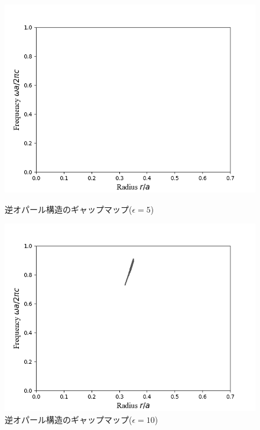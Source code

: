\documentclass[platex,dvipdfmx]{jsreport}
\numberwithin{equation}{section}
\begin{document}
\begin{figure}[h]
  \begin{minipage}[h]{0.5\linewidth}
    \centering
    \includegraphics[keepaspectratio, scale=0.45]{results/gap_map/inv_e-5.png}
    \caption{逆オパール構造のギャップマップ($\epsilon = 5$)}
    \label{fig:gapmap_inv_opal_e-5}
  \end{minipage}
  \begin{minipage}[h]{0.5\linewidth}
    \centering
    \includegraphics[keepaspectratio, scale=0.45]{results/gap_map/inv_e-10.png}
    \caption{逆オパール構造のギャップマップ($\epsilon = 10$)}
    \label{fig:gapmap_inv_opal_e-10}
  \end{minipage}
  \begin{minipage}[h]{0.5\linewidth}

\end{minipage}
\end{figure}
\end{document}
